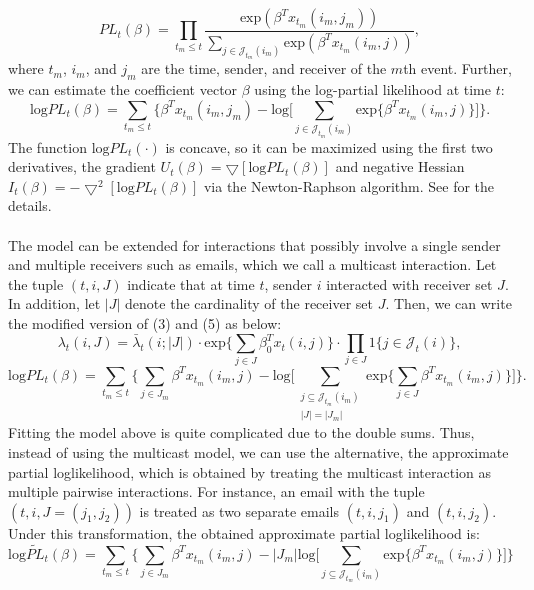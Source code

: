 \documentclass[a4paper]{article}
\begin{document}
\begin{equation}
PL_t(\beta)=\prod_{t_m\leq t} \frac{\mbox{exp}(\beta^Tx_{t_m}(i_m, j_m))}{\sum_{j\in \mathcal{J}_{t_m}(i_m)} \mbox{exp}(\beta^Tx_{t_m}(i_m, j))},
\end{equation}
where $t_m$, $i_m$, and $j_m$ are the time, sender, and receiver
of the $m$th event.
Further, we can estimate the coefficient vector $\beta$ using the log-partial likelihood at time $t$:
\begin{equation}
\mbox{log}PL_t(\beta)=\sum_{t_m\leq t} \Big\{\beta^Tx_{t_m}(i_m, j_m)-\mbox{log}\big[\sum_{j\in \mathcal{J}_{t_m}(i_m)} \mbox{exp}\{\beta^Tx_{t_m}(i_m, j)\}\big]\Big\}.
\end{equation}
The function $\mbox{log}PL_t(\cdot)$ is concave, so it can be maximized using the first two derivatives, the gradient $U_t(\beta)=\bigtriangledown[\mbox{log}PL_t(\beta)]$ and negative Hessian $I_t(\beta)=-\bigtriangledown^2[\mbox{log}PL_t(\beta)]$ via the Newton-Raphson algorithm. See \cite{PerryWolfe2012} for the details.\\\\
The model can be extended for interactions that possibly involve a single sender and multiple receivers such as emails, which we call a multicast interaction. Let the tuple $(t, i, J)$ indicate that at time $t$, sender $i$ interacted with receiver set $J$. In addition, let $|J|$ denote the cardinality of the receiver set $J$. Then, we can write the modified version of (3) and (5) as below:
\begin{equation}\lambda_t(i,J)=\bar\lambda_t(i; |J|)\cdot \mbox{exp}\{\sum_{j\in J}\beta_0^Tx_t(i, j)\}\cdot\prod_{j\in J} 1\{j \in \mathcal{J}_t(i)\},
\end{equation}
\begin{equation}
\mbox{log}PL_t(\beta)=\sum_{t_m\leq t} \Big\{\sum_{j\in J_m}\beta^Tx_{t_m}(i_m, j)-\mbox{log}\big[\sum_{\substack{j\subseteq \mathcal{J}_{t_m}(i_m)\\|J|=|J_m|}}\mbox{exp}\{\sum_{j\in  J}\beta^Tx_{t_m}(i_m, j)\}\big]\Big\}.
\end{equation}
Fitting the model above is quite complicated due to the double sums. Thus, instead of using the multicast model, we can use the alternative, the approximate partial loglikelihood, which is obtained by treating the multicast interaction as multiple pairwise interactions. For instance, an email with the tuple $(t, i, J=(j_1, j_2))$ is treated as two separate emails $(t, i, j_1)$ and $(t, i, j_2)$. Under this transformation, the obtained approximate partial loglikelihood is:\begin{equation}
\mbox{log}\widetilde{PL}_t(\beta)=\sum_{t_m\leq t} \Big\{\sum_{j\in J_m}\beta^Tx_{t_m}(i_m, j)-|J_m|\mbox{log}\big[\sum_{j\subseteq \mathcal{J}_{t_m}(i_m)}\mbox{exp}\{\beta^Tx_{t_m}(i_m, j)\}\big]\Big\}
\end{equation}
\end{document}
